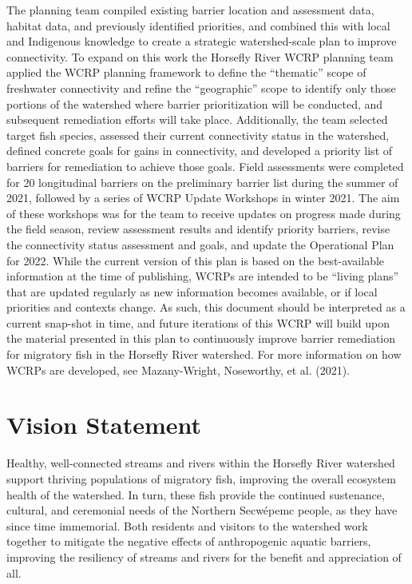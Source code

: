 \documentclass[
  letterpaper,
  DIV=11,
  numbers=noendperiod]{scrreprt}
\begin{document}
The planning team compiled existing barrier location and assessment
data, habitat data, and previously identified priorities, and combined
this with local and Indigenous knowledge to create a strategic
watershed-scale plan to improve connectivity. To expand on this work the
Horsefly River WCRP planning team applied the WCRP planning framework to
define the ``thematic'' scope of freshwater connectivity and refine the
``geographic'' scope to identify only those portions of the watershed
where barrier prioritization will be conducted, and subsequent
remediation efforts will take place. Additionally, the team selected
target fish species, assessed their current connectivity status in the
watershed, defined concrete goals for gains in connectivity, and
developed a priority list of barriers for remediation to achieve those
goals. Field assessments were completed for 20 longitudinal barriers on
the preliminary barrier list during the summer of 2021, followed by a
series of WCRP Update Workshops in winter 2021. The aim of these
workshops was for the team to receive updates on progress made during
the field season, review assessment results and identify priority
barriers, revise the connectivity status assessment and goals, and
update the Operational Plan for 2022. While the current version of this
plan is based on the best-available information at the time of
publishing, WCRPs are intended to be ``living plans'' that are updated
regularly as new information becomes available, or if local priorities
and contexts change. As such, this document should be interpreted as a
current snap-shot in time, and future iterations of this WCRP will build
upon the material presented in this plan to continuously improve barrier
remediation for migratory fish in the Horsefly River watershed. For more
information on how WCRPs are developed, see Mazany-Wright, Noseworthy,
et al. (2021).

\hypertarget{vision-statement}{%
\section*{Vision Statement}\label{vision-statement}}


Healthy, well-connected streams and rivers within the Horsefly River
watershed support thriving populations of migratory fish, improving the
overall ecosystem health of the watershed. In turn, these fish provide
the continued sustenance, cultural, and ceremonial needs of the Northern
Secwépemc people, as they have since time immemorial. Both residents and
visitors to the watershed work together to mitigate the negative effects
of anthropogenic aquatic barriers, improving the resiliency of streams
and rivers for the benefit and appreciation of all.
\end{document}
